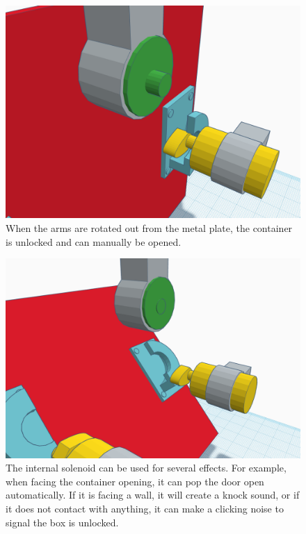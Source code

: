 \documentclass[conference]{IEEEtran}
\begin{document}
\begin{figure}[H]
    \centering
    \includegraphics[width=0.85\columnwidth]{Images/OpenLock.png}
    \caption{When the arms are rotated out from the metal plate, the container is unlocked and can manually be opened.}
\end{figure}

\begin{figure}[H]
    \centering
    \includegraphics[width=0.85\columnwidth]{Images/OpenContainer.png}
    \caption{The internal solenoid can be used for several effects. For example, when facing the container opening, it can pop the
        door open automatically. If it is facing a wall, it will create a knock sound, or if it does not contact with anything, it can
        make a clicking noise to signal the box is unlocked.}
\end{figure}
\end{document}

